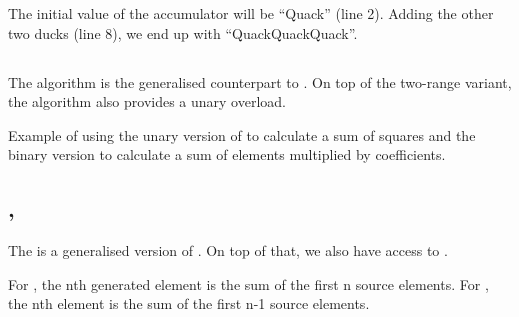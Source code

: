 The initial value of the accumulator will be “Quack” (line 2). Adding the other two ducks (line 8), we end up with “QuackQuackQuack”.

\subsection{\texorpdfstring{}{\texttt{std::transform\_reduce}}}

The  algorithm is the generalised counterpart to . On top of the two-range variant, the algorithm also provides a unary overload.


\begin{box-note}
\footnotesize Example of using the unary version of  to calculate a sum of squares and the binary version to calculate a sum of elements multiplied by coefficients.
\tcblower
{}
\end{box-note}

\subsection{\texorpdfstring{, }{\texttt{std::inclusive\_scan}, \texttt{std::exclusive\_scan}}}

The  is a generalised version of . On top of that, we also have access to .

For , the nth generated element is the sum of the first n source elements. For , the nth element is the sum of the first n-1 source elements.



